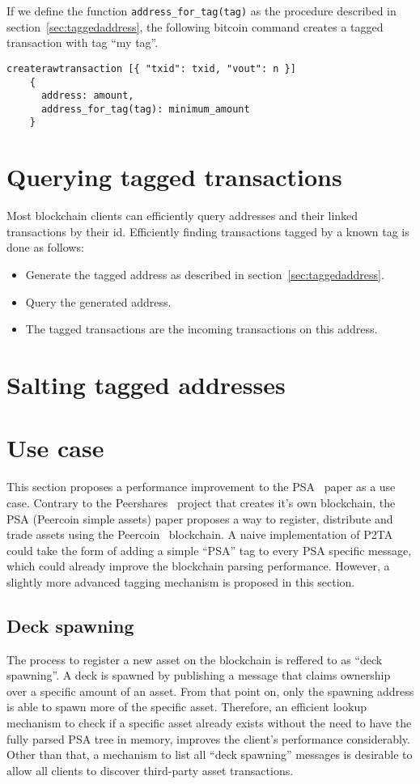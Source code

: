 \documentclass[a4paper,10pt]{article}
\begin{document}
If we define the function \verb|address_for_tag(tag)| as the procedure described in section~\ref{sec:taggedaddress}, the following bitcoin command creates a tagged transaction with tag ``my tag''.
\begin{verbatim}
createrawtransaction [{ "txid": txid, "vout": n }]
    {
      address: amount,
      address_for_tag(tag): minimum_amount
    }
\end{verbatim}


\section{Querying tagged transactions}
Most blockchain clients can efficiently query addresses and their linked transactions by their id.
Efficiently finding transactions tagged by a known tag is done as follows:
\begin{itemize}
 \item Generate the tagged address as described in section~\ref{sec:taggedaddress}.
 \item Query the generated address.
 \item The tagged transactions are the incoming transactions on this address.
\end{itemize}


\section{Salting tagged addresses}


\section{Use case}
This section proposes a performance improvement to the PSA~\cite{Pchem} paper as a use case.
Contrary to the Peershares~\cite{TODO} project that creates it's own blockchain, the PSA (Peercoin simple assets) paper proposes a way to register, distribute and trade assets using the Peercoin~\cite{TODO} blockchain.
A naive implementation of P2TA could take the form of adding a simple ``PSA'' tag to every PSA specific message, which could already improve the blockchain parsing performance.
However, a slightly more advanced tagging mechanism is proposed in this section.

\subsection{Deck spawning}
The process to register a new asset on the blockchain is reffered to as ``deck spawning''. A deck is spawned by publishing a message that claims ownership over a specific amount of an asset. From that point on, only the spawning address is able to spawn more of the specific asset. Therefore, an efficient lookup mechanism to check if a specific asset already exists without the need to have the fully parsed PSA tree in memory, improves the client's performance considerably. Other than that, a mechanism to list all ``deck spawning'' messages is desirable to allow all clients to discover third-party asset transactions.
\end{document}
